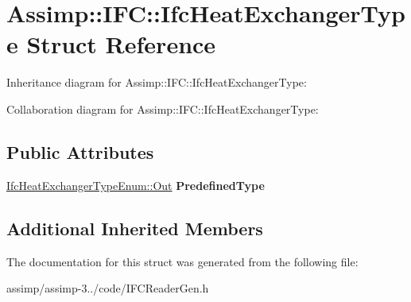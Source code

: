 \hypertarget{struct_assimp_1_1_i_f_c_1_1_ifc_heat_exchanger_type}{\section{Assimp\+:\+:I\+F\+C\+:\+:Ifc\+Heat\+Exchanger\+Type Struct Reference}
\label{struct_assimp_1_1_i_f_c_1_1_ifc_heat_exchanger_type}
}


Inheritance diagram for Assimp\+:\+:I\+F\+C\+:\+:Ifc\+Heat\+Exchanger\+Type\+:


Collaboration diagram for Assimp\+:\+:I\+F\+C\+:\+:Ifc\+Heat\+Exchanger\+Type\+:
\subsection*{Public Attributes}
\begin{DoxyCompactItemize}
\item 
\hypertarget{struct_assimp_1_1_i_f_c_1_1_ifc_heat_exchanger_type_afb93b1f40deeb7ebcf50a8ecac7482d2}{\hyperlink{classboost_1_1shared__ptr}{Ifc\+Heat\+Exchanger\+Type\+Enum\+::\+Out} {\bfseries Predefined\+Type}}\label{struct_assimp_1_1_i_f_c_1_1_ifc_heat_exchanger_type_afb93b1f40deeb7ebcf50a8ecac7482d2}

\end{DoxyCompactItemize}
\subsection*{Additional Inherited Members}


The documentation for this struct was generated from the following file\+:\begin{DoxyCompactItemize}
\item 
assimp/assimp-\/3../code/I\+F\+C\+Reader\+Gen.\+h\end{DoxyCompactItemize}
